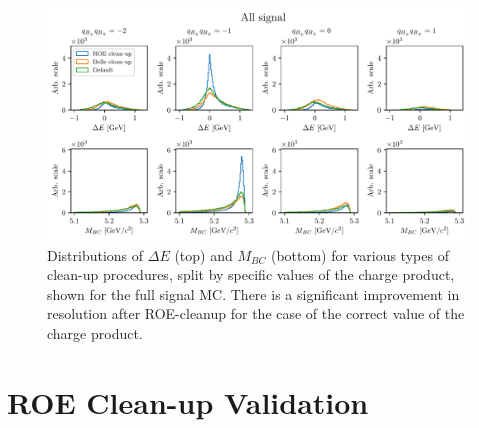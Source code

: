 \begin{figure}[H]
	\centering
	\captionsetup{width=0.8\linewidth}
	\includegraphics[width=\linewidth]{fig/roe_split}
	\caption{Distributions of $\Delta E$ (top) and $M_{BC}$ (bottom) for various types of clean-up procedures, split by specific values of the charge product, shown for the full signal MC. There is a significant improvement in resolution after ROE-cleanup for the case of the correct value of the charge product.}
	\label{fig:roe_split}
\end{figure}

\section{ROE Clean-up Validation}

